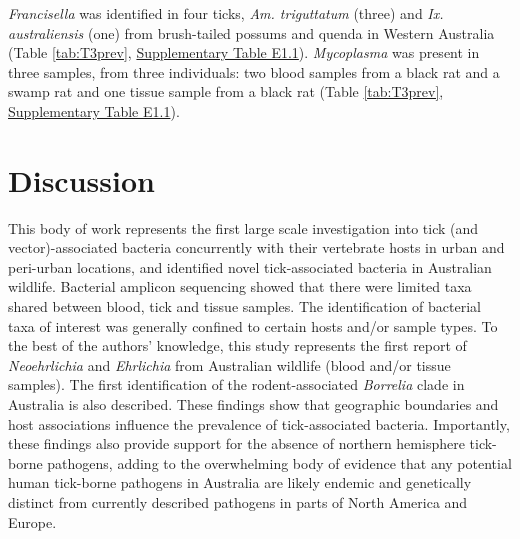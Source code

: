 \documentclass[a4paper, nobind]{templates/ociamthesis}
\begin{document}
\emph{Francisella} was identified in four ticks, \emph{Am. triguttatum} (three) and \emph{Ix. australiensis} (one) from brush-tailed possums and quenda in Western Australia (Table \ref{tab:T3prev}, \protect\hyperlink{supplementary-table-e1.1}{Supplementary Table E1.1}).
\emph{Mycoplasma} was present in three samples, from three individuals: two blood samples from a black rat and a swamp rat and one tissue sample from a black rat (Table \ref{tab:T3prev}, \protect\hyperlink{supplementary-table-e1.1}{Supplementary Table E1.1}).

\hypertarget{discussion}{%
\section{Discussion}\label{discussion}}

This body of work represents the first large scale investigation into tick (and vector)-associated bacteria concurrently with their vertebrate hosts in urban and peri-urban locations, and identified novel tick-associated bacteria in Australian wildlife.
Bacterial amplicon sequencing showed that there were limited taxa shared between blood, tick and tissue samples.
The identification of bacterial taxa of interest was generally confined to certain hosts and/or sample types.
To the best of the authors' knowledge, this study represents the first report of \emph{Neoehrlichia} and \emph{Ehrlichia} from Australian wildlife (blood and/or tissue samples).
The first identification of the rodent-associated \emph{Borrelia} clade in Australia is also described.
These findings show that geographic boundaries and host associations influence the prevalence of tick-associated bacteria.
Importantly, these findings also provide support for the absence of northern hemisphere tick-borne pathogens, adding to the overwhelming body of evidence that any potential human tick-borne pathogens in Australia are likely endemic and genetically distinct from currently described pathogens in parts of North America and Europe.
\end{document}
